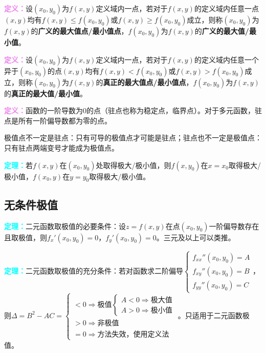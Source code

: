 \documentclass[UTF8, 12pt]{ctexart}
\begin{document}
\textcolor{violet}{\textbf{定义：}}设$(x_0,y_0)$为$f(x,y)$定义域内一点，若对于$f(x,y)$的定义域内任意一点$(x,y)$均有$f(x,y)\leqslant f(x_0,y_0)$或$f(x,y)\geqslant f(x_0,y_0)$成立，则称$(x_0,y_0)$为$f(x,y)$的\textbf{广义的最大值点/最小值点}，$f(x_0,y_0)$为$f(x,y)$的\textbf{广义的最大值/最小值}。

\textcolor{violet}{\textbf{定义：}}设$(x_0,y_0)$为$f(x,y)$定义域内一点，若对于$f(x,y)$的定义域内任意一个异于$(x_0,y_0)$的点$(x,y)$均有$f(x,y)<f(x_0,y_0)$或$f(x,y)>f(x_0,y_0)$成立，则称$(x_0,y_0)$为$f(x,y)$的\textbf{真正的最大值点/最小值点}，$f(x_0,y_0)$为$f(x,y)$的\textbf{真正的最大值/最小值}。

\textcolor{violet}{\textbf{定义：}}函数的一阶导数为0的点（驻点也称为稳定点，临界点）。对于多元函数，驻点是所有一阶偏导数都为零的点。

极值点不一定是驻点：只有可导的极值点才可能是驻点；驻点也不一定是极值点：只有驻点两端变号才能成为极值点。

\textcolor{aqua}{\textbf{定理：}}若$f(x,y)$在$(x_0,y_0)$处取得极大/极小值，则$f(x,y_0)$在$x=x_0$取得极大/极小值，$f(x_0,y)$在$y=y_0$取得极大/极小值。

\subsection{无条件极值}

\textcolor{aqua}{\textbf{定理：}}二元函数取极值的必要条件：设$z=f(x,y)$在点$(x_0,y_0)$一阶偏导数存在且取极值，则$f_x'(x_0,y_0)=0$，$f_y'(x_0,y_0)=0$。三元及以上可以类推。

\textcolor{aqua}{\textbf{定理：}}二元函数取极值的充分条件：若对函数求二阶偏导$\left\{\begin{array}{l}
    f_{xx}''(x_0,y_0)=A \\
    f_{xy}''(x_0,y_0)=B \\
    f_{yy}''(x_0,y_0)=C
\end{array}\right.$，则$\Delta=B^2-AC=\left\{\begin{array}{l}
    <0\Rightarrow\text{极值}\left\{\begin{array}{l}
        A<0\Rightarrow\text{极大值} \\
        A>0\Rightarrow\text{极小值}
    \end{array}\right. \\
    >0\Rightarrow\text{非极值} \\
    =0\Rightarrow\text{方法失效，使用定义法}
\end{array}\right.$。只适用于二元函数极值。
\end{document}
